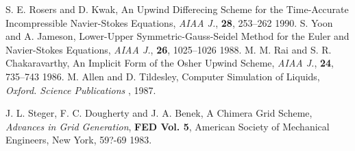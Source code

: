 \documentclass{CFD2010paper}
\begin{document}
\begin{thebibliography}{99}
 S. E. Rosers and D. Kwak, An Upwind Differecing Scheme for the Time-Accurate Incompressible Navier-Stokes Equations, \textit{AIAA J.}, \textbf{28}, 253--262 {1990}.
 S. Yoon and A. Jameson, Lower-Upper Symmetric-Gauss-Seidel Method for the Euler and Navier-Stokes Equations, \textit{AIAA J.}, \textbf{26}, 1025--1026 {1988}.
 M. M. Rai and S. R. Chakaravarthy, An Implicit Form of the Osher Upwind Scheme, \textit{AIAA J.}, \textbf{24}, 735--743 {1986}.
 M. Allen and D. Tildesley, Computer Simulation of Liquids, \textit{Oxford. Science Publications }, {1987}.

 J. L. Steger, F. C. Dougherty and J. A. Benek, A Chimera Grid Scheme, \textit{Advances in Grid Generation}, \textbf{FED Vol. 5}, American Society of Mechanical Engineers, New York, 59?-69 {1983}.

\end{thebibliography}
\end{document}
